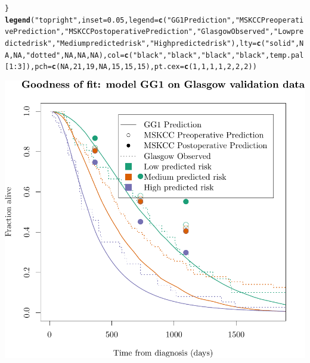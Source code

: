 \documentclass{article}\usepackage[]{graphicx}\usepackage[]{color}
\makeatletter
\def\maxwidth{ %
  \ifdim\Gin@nat@width>\linewidth
    \linewidth
  \else
    \Gin@nat@width
  \fi
}
\newcommand{\hlnum}[1]{\textcolor[rgb]{0.686,0.059,0.569}{#1}}%
\newcommand{\hlstr}[1]{\textcolor[rgb]{0.192,0.494,0.8}{#1}}%
\newcommand{\hlopt}[1]{\textcolor[rgb]{0,0,0}{#1}}%
\newcommand{\hlstd}[1]{\textcolor[rgb]{0.345,0.345,0.345}{#1}}%
\newcommand{\hlkwc}[1]{\textcolor[rgb]{0.333,0.667,0.333}{#1}}%
\newcommand{\hlkwd}[1]{\textcolor[rgb]{0.737,0.353,0.396}{\textbf{#1}}}%
\newenvironment{kframe}{%
 \def\at@end@of@kframe{}%
 \ifinner\ifhmode%
  \def\at@end@of@kframe{\end{minipage}}%
  \begin{minipage}{\columnwidth}%
 \fi\fi%
 \def\FrameCommand##1{\hskip\@totalleftmargin \hskip-\fboxsep
 \colorbox{shadecolor}{##1}\hskip-\fboxsep
     \hskip-\linewidth \hskip-\@totalleftmargin \hskip\columnwidth}%
 \MakeFramed {\advance\hsize-\width
   \@totalleftmargin\z@ \linewidth\hsize
   \@setminipage}}%
 {\par\unskip\endMakeFramed%
 \at@end@of@kframe}
\newenvironment{knitrout}{}{} %
\makeatother
\begin{document}
\begin{knitrout}
\begin{kframe}
\begin{alltt}
\hlstd{\}}
\hlkwd{legend}\hlstd{(}\hlstr{"topright"}\hlstd{,} \hlkwc{inset} \hlstd{=} \hlnum{0.05}\hlstd{,} \hlkwc{legend} \hlstd{=} \hlkwd{c}\hlstd{(}\hlstr{"GG1 Prediction"}\hlstd{,} \hlstr{"MSKCC Preoperative Prediction"}\hlstd{,} \hlstr{"MSKCC Postoperative Prediction"}\hlstd{,} \hlstr{"Glasgow Observed"}\hlstd{,} \hlstr{"Low predicted risk"}\hlstd{,} \hlstr{"Medium predicted risk"}\hlstd{,} \hlstr{"High predicted risk"}\hlstd{),} \hlkwc{lty} \hlstd{=} \hlkwd{c}\hlstd{(}\hlstr{"solid"}\hlstd{,} \hlnum{NA}\hlstd{,} \hlnum{NA}\hlstd{,} \hlstr{"dotted"}\hlstd{,} \hlnum{NA}\hlstd{,} \hlnum{NA}\hlstd{,} \hlnum{NA}\hlstd{),} \hlkwc{col} \hlstd{=} \hlkwd{c}\hlstd{(}\hlstr{"black"}\hlstd{,} \hlstr{"black"}\hlstd{,} \hlstr{"black"}\hlstd{,} \hlstr{"black"}\hlstd{, temp.pal[}\hlnum{1}\hlopt{:}\hlnum{3}\hlstd{]),} \hlkwc{pch} \hlstd{=} \hlkwd{c}\hlstd{(}\hlnum{NA}\hlstd{,} \hlnum{21}\hlstd{,} \hlnum{19}\hlstd{,} \hlnum{NA}\hlstd{,} \hlnum{15}\hlstd{,} \hlnum{15}\hlstd{,} \hlnum{15}\hlstd{),} \hlkwc{pt.cex} \hlstd{=} \hlkwd{c}\hlstd{(}\hlnum{1}\hlstd{,} \hlnum{1}\hlstd{,} \hlnum{1}\hlstd{,} \hlnum{1}\hlstd{,} \hlnum{2}\hlstd{,} \hlnum{2}\hlstd{,} \hlnum{2}\hlstd{))}
\end{alltt}
\end{kframe}

{\centering \includegraphics[width=\maxwidth]{figure/07-altman-4-glasgow-1} 

}



\end{knitrout}
\end{document}

